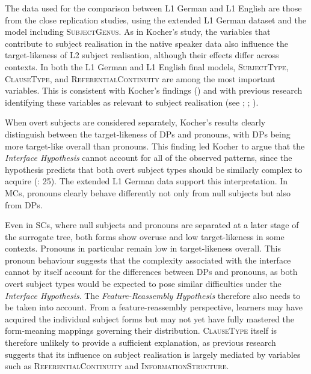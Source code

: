 \documentclass[
  letterpaper,
  DIV=11,
  numbers=noendperiod]{scrartcl}
\begin{document}
The data used for the comparison between L1 German and L1 English are
those from the close replication studies, using the extended L1 German
dataset and the model including \textsc{SubjectGenus}. As in Kocher's
study, the variables that contribute to subject realisation in the
native speaker data also influence the target-likeness of L2 subject
realisation, although their effects differ across contexts. In both the
L1 German and L1 English final models, \textsc{SubjectType, ClauseType,}
and \textsc{ReferentialContinuity} are among the most important
variables. This is consistent with Kocher's findings
() and with previous research
identifying these variables as relevant to subject realisation (see
;
;
).

When overt subjects are considered separately, Kocher's results clearly
distinguish between the target-likeness of DPs and pronouns, with DPs
being more target-like overall than pronouns. This finding led Kocher to
argue that the \emph{Interface Hypothesis} cannot account for all of the
observed patterns, since the hypothesis predicts that both overt subject
types should be similarly complex to acquire
(: 25). The extended L1 German
data support this interpretation. In MCs, pronouns clearly behave
differently not only from null subjects but also from DPs.

Even in SCs, where null subjects and pronouns are separated at a later
stage of the surrogate tree, both forms show overuse and low
target-likeness in some contexts. Pronouns in particular remain low in
target-likeness overall. This pronoun behaviour suggests that the
complexity associated with the interface cannot by itself account for
the differences between DPs and pronouns, as both overt subject types
would be expected to pose similar difficulties under the \emph{Interface
Hypothesis}. The \emph{Feature-Reassembly Hypothesis} therefore also
needs to be taken into account. From a feature-reassembly perspective,
learners may have acquired the individual subject forms but may not yet
have fully mastered the form-meaning mappings governing their
distribution. \textsc{ClauseType} itself is therefore unlikely to
provide a sufficient explanation, as previous research suggests that its
influence on subject realisation is largely mediated by variables such
as \textsc{ReferentialContinuity} and \textsc{InformationStructure}.
\end{document}
